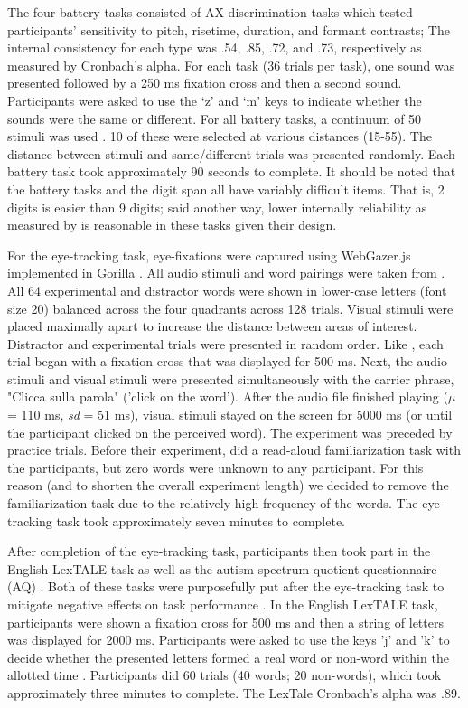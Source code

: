 The four battery tasks consisted of AX discrimination tasks which tested participants' sensitivity to pitch, risetime, duration, and formant contrasts; The internal consistency for each type was .54, .85, .72, and .73, respectively as measured by Cronbach's alpha. For each task (36 trials per task), one sound was presented followed by a 250 ms fixation cross and then a second sound. Participants were asked to use the `z' and `m' keys to indicate whether the sounds were the same or different. For all battery tasks, a continuum of 50 stimuli was used . 10 of these were selected at various distances (15-55). The distance between stimuli and same/different trials was presented randomly. Each battery task took approximately 90 seconds to complete. It should be noted that the battery tasks and the digit span all have variably difficult items. That is, 2 digits is easier than 9 digits; said another way, lower internally reliability as measured by is reasonable in these tasks given their design. 

For the eye-tracking task, eye-fixations were captured using WebGazer.js  implemented in Gorilla . All audio stimuli and word pairings were taken from . All 64 experimental and distractor words were shown in lower-case letters (font size 20) balanced across the four quadrants across 128 trials. Visual stimuli were placed maximally apart to increase the distance between areas of interest. Distractor and experimental trials were presented in random order. Like , each trial began with a fixation cross that was displayed for 500 ms. Next, the audio stimuli and visual stimuli were presented simultaneously with the carrier phrase, "Clicca sulla parola" ('click on the word'). After the audio file finished playing ($\mu$ = 110 ms, \textit{sd} = 51 ms), visual stimuli stayed on the screen for 5000 ms (or until the participant clicked on the perceived word). The experiment was preceded by practice trials. Before their experiment,  did a read-aloud familiarization task with the participants, but zero words were unknown to any participant. For this reason (and to shorten the overall experiment length) we decided to remove the familiarization task due to the relatively high frequency of the words. The eye-tracking task took approximately seven minutes to complete.

After completion of the eye-tracking task, participants then took part in the English LexTALE  task as well as the autism-spectrum quotient questionnaire (AQ) . Both of these tasks were purposefully put after the eye-tracking task to mitigate negative effects on task performance . In the English LexTALE task, participants were shown a fixation cross for 500 ms and then a string of letters was displayed for 2000 ms. Participants were asked to use the keys 'j' and 'k' to decide whether the presented letters formed a real word or non-word within the allotted time . Participants did 60 trials (40 words; 20 non-words), which took approximately three minutes to complete. The LexTale Cronbach’s alpha was .89.  

